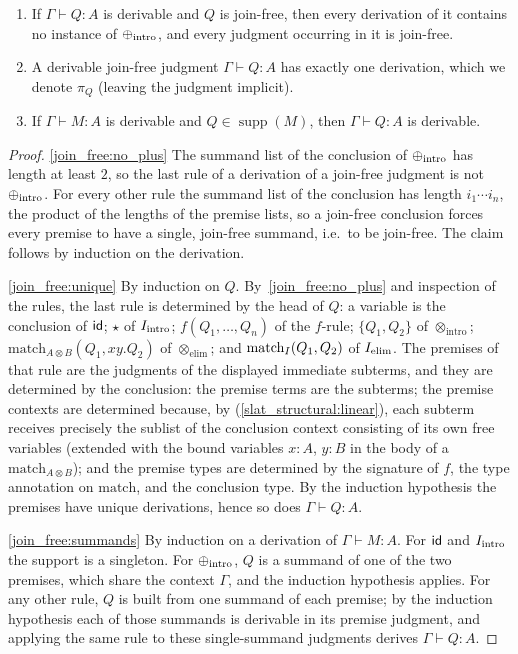 \begin{lemma}
\label{lemma:join_free}
\leavevmode
\begin{enumerate}
  \item\label{join_free:no_plus} If $\Gamma \vdash Q : A$ is derivable and $Q$ is join-free, then every derivation of it contains no instance of $\mathbin{\oplus}_{\text{intro}}$, and every judgment occurring in it is join-free.
  \item\label{join_free:unique} A derivable join-free judgment $\Gamma \vdash Q : A$ has exactly one derivation, which we denote $\pi_{Q}$ (leaving the judgment implicit).
  \item\label{join_free:summands} If $\Gamma \vdash M : A$ is derivable and $Q \in \operatorname{supp}(M)$, then $\Gamma \vdash Q : A$ is derivable.
\end{enumerate}
\end{lemma}
\begin{proof}
\ref{join_free:no_plus} The summand list of the conclusion of $\mathbin{\oplus}_{\text{intro}}$ has length at least $2$, so the last rule of a derivation of a join-free judgment is not $\mathbin{\oplus}_{\text{intro}}$.
For every other rule the summand list of the conclusion has length $i_1 \cdots i_n$, the product of the lengths of the premise lists, so a join-free conclusion forces every premise to have a single, join-free summand, i.e.\ to be join-free.
The claim follows by induction on the derivation.

\ref{join_free:unique} By induction on $Q$.
By~\ref{join_free:no_plus} and inspection of the rules, the last rule is determined by the head of $Q$: a variable is the conclusion of $\textsf{id}$; $\star$ of $I_{\text{intro}}$; $f(Q_1, \ldots, Q_n)$ of the $f$-rule; $\{Q_1, Q_2\}$ of $\otimes_{\text{intro}}$; $\text{match}_{A \otimes B}(Q_1, xy.Q_2)$ of $\otimes_{\text{elim}}$; and $\text{match}_{I}(Q_1, Q_2)$ of $I_{\text{elim}}$.
The premises of that rule are the judgments of the displayed immediate subterms, and they are determined by the conclusion: the premise terms are the subterms; the premise contexts are determined because, by (\ref{slat_structural:linear}), each subterm receives precisely the sublist of the conclusion context consisting of its own free variables (extended with the bound variables $x : A$, $y : B$ in the body of a $\text{match}_{A \otimes B}$); and the premise types are determined by the signature of $f$, the type annotation on $\text{match}$, and the conclusion type.
By the induction hypothesis the premises have unique derivations, hence so does $\Gamma \vdash Q : A$.

\ref{join_free:summands} By induction on a derivation of $\Gamma \vdash M : A$.
For $\textsf{id}$ and $I_{\text{intro}}$ the support is a singleton.
For $\mathbin{\oplus}_{\text{intro}}$, $Q$ is a summand of one of the two premises, which share the context $\Gamma$, and the induction hypothesis applies.
For any other rule, $Q$ is built from one summand of each premise; by the induction hypothesis each of those summands is derivable in its premise judgment, and applying the same rule to these single-summand judgments derives $\Gamma \vdash Q : A$.
\end{proof}

